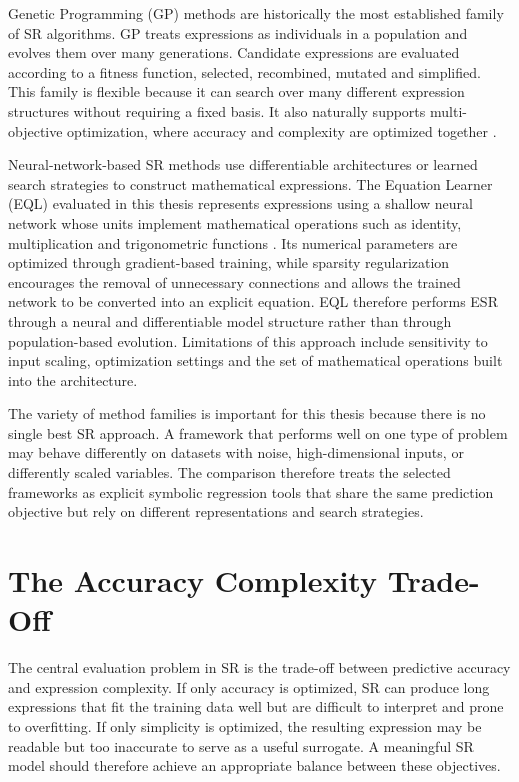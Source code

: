 \documentclass[12pt,oneside,bibtotoc,liststotoc]{scrbook}
\begin{document}
Genetic Programming (GP) methods are historically the most established family of SR algorithms. GP treats expressions as individuals in a population and evolves them over many generations. Candidate expressions are evaluated according to a fitness function, selected, recombined, mutated and simplified. This family is flexible because it can search over many different expression structures without requiring a fixed basis. It also naturally supports multi-objective optimization, where accuracy and complexity are optimized together \cite{angelis2023artificial,lacava2021contemporary}.

Neural-network-based SR methods use differentiable architectures or learned search strategies to construct mathematical expressions. The Equation Learner (EQL) evaluated in this thesis represents expressions using a shallow neural network whose units implement mathematical operations such as identity, multiplication and trigonometric functions \cite{sahoo2018eql}. Its numerical parameters are optimized through gradient-based training, while sparsity regularization encourages the removal of unnecessary connections and allows the trained network to be converted into an explicit equation. EQL therefore performs ESR through a neural and differentiable model structure rather than through population-based evolution. Limitations of this approach include sensitivity to input scaling, optimization settings and the set of mathematical operations built into the architecture.

The variety of method families is important for this thesis because there is no single best SR approach. A framework that performs well on one type of problem may behave differently on datasets with noise, high-dimensional inputs, or differently scaled variables. The comparison therefore treats the selected frameworks as explicit symbolic regression tools that share the same prediction objective but rely on different representations and search strategies.

\section{The Accuracy Complexity Trade-Off}

The central evaluation problem in SR is the trade-off between predictive accuracy and expression complexity. If only accuracy is optimized, SR can produce long expressions that fit the training data well but are difficult to interpret and prone to overfitting. If only simplicity is optimized, the resulting expression may be readable but too inaccurate to serve as a useful surrogate. A meaningful SR model should therefore achieve an appropriate balance between these objectives.
\end{document}
